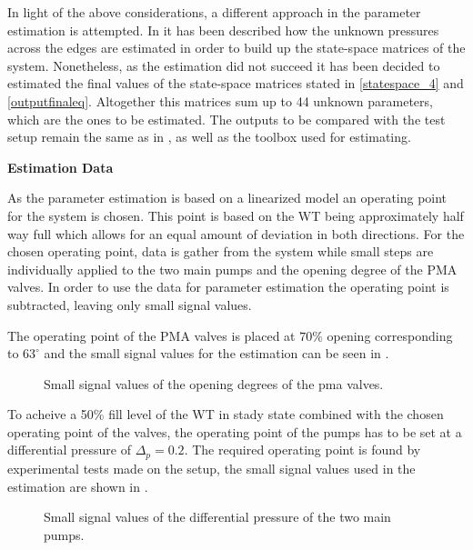 In light of the above considerations, a different approach in the parameter estimation is attempted. In  it has been described how the 
unknown pressures across the edges are estimated in order to build up the state-space matrices of the system. Nonetheless, as the estimation did not 
succeed it has been decided to estimated the final values of the state-space matrices stated in \eqref{statespace_4} and \eqref{outputfinaleq}. 
Altogether this matrices sum up to 44 unknown parameters, which are the ones to be estimated. The outputs to be compared with the test setup remain 
the same as in , as well as the toolbox used for estimating.

\textbf{Estimation Data}

As the parameter estimation is based on a linearized model an operating point for the system is chosen. This point is based on the WT being approximately half way full which allows for an equal amount of deviation in both directions. For the chosen operating point, data is gather from the system while small steps are individually applied to the two main pumps and the opening degree of the PMA valves. In order to use the data for parameter estimation the operating point is subtracted, leaving only small signal values.  

The operating point of the PMA valves is placed at $70\%$ opening corresponding to $63^{\circ}$ and the small signal values for the estimation can be seen in .

\begin{figure}[H]
\centering
 
\caption{Small signal values of the opening degrees of the pma valves.}
\label{fig:est_OD_data_final}
\end{figure}

To acheive a 50\% fill level of the WT in stady state combined with the chosen operating point of the valves, the operating point of the pumps has to be set at a differential pressure of $\Delta _p = 0.2$. The required operating point is found by experimental tests made on the setup, the small signal values used in the estimation are shown in . 

\begin{figure}[H]
\centering
 
\caption{Small signal values of the differential pressure of the two main pumps.}
\label{fig:est_deltap_data_final}
\end{figure}



